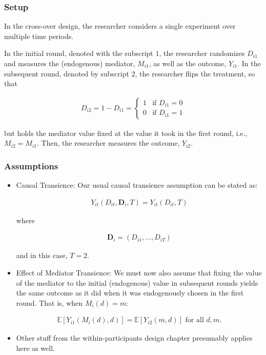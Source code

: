 \documentclass[10pt]{article}
\begin{document}
\subsubsection{Setup}

In the cross-over design, 
the researcher considers a single experiment 
over multiple time periods.

In the initial round, denoted with the subscript $1$,
the researcher randomizes $D_{i1}$
and measures the (endogenous) mediator, $M_{i1}$,
as well as the outcome, $Y_{i1}$.
In the subsequent round, denoted by subscript 
$2$, the researcher flips the treatment, so that 

\begin{align}
    D_{i2} = 1 - D_{i1} = \begin{cases}
        1 & \text{if } D_{i1} = 0 \\
        0 & \text{if } D_{i1} = 1
    \end{cases}
\end{align}

but holds the mediator value 
fixed at the value 
it took in the first round, i.e., $M_{i2} = M_{i1}$.
Then, the researcher measures the outcome, $Y_{i2}$.

\subsubsection{Assumptions}

\begin{itemize}
    \item Causal Transience: Our usual causal transience assumption can be stated as:

        \begin{align}
            Y_{i t}\left(D_{i t}, \boldsymbol{D}_i, T\right)=Y_{i t}\left(D_{i t}, T\right)
        \end{align}
        
        where 
        
        \begin{align}
            \boldsymbol{D}_{i}=\left(D_{i 1}, \ldots, D_{i T}\right)
        \end{align}
        
        and in this case, $T=2$.
    \item Effect of Mediator Transience: We must now 
        also assume that fixing the value of the mediator to 
        the initial (endogenous) value in subsequent 
        rounds yields the same outcome as it did when it was 
        endogenously chosen in the first round. That is,
        when $M_i(d)=m$:

        \begin{align}
            \mathbb{E}\left[Y_{i 1}\left(M_i(d), d\right)\right]=\mathbb{E}\left[Y_{i 2}(m, d)\right] \text { for all } d, m .
        \end{align}
    \item Other stuff from the within-participants design chapter 
        presumably applies here as well.
\end{itemize}
\end{document}
